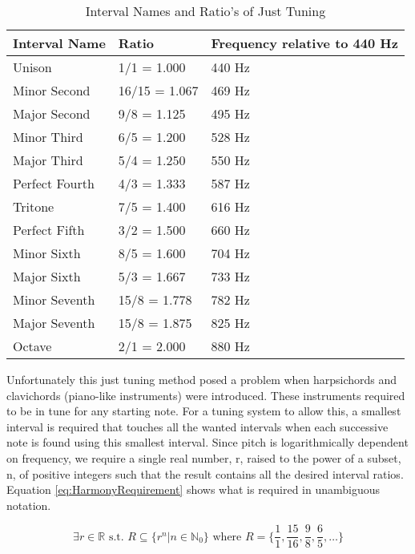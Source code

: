 \begin{table}[h]
\centering
\caption{Interval Names and Ratio's of Just Tuning}
\begin{tabu} to \textwidth { | X[l] | X[c] | X[r] | }
	\hline \bf Interval Name & \bf Ratio  & Frequency relative to 440 Hz \\
	\hline Unison & 1/1 = 1.000 & 440 Hz \\
	\hline Minor Second & 16/15 = 1.067 & 469 Hz \\
	\hline Major Second & 9/8 = 1.125 & 495 Hz \\
	\hline Minor Third & 6/5 = 1.200 & 528 Hz \\
	\hline Major Third & 5/4 = 1.250 & 550 Hz \\
	\hline Perfect Fourth & 4/3 = 1.333 & 587 Hz \\
	\hline Tritone & 7/5 = 1.400 & 616 Hz \\
	\hline Perfect Fifth & 3/2 = 1.500 & 660 Hz \\
	\hline Minor Sixth & 8/5 = 1.600 & 704 Hz \\
	\hline Major Sixth & 5/3 = 1.667 & 733 Hz \\
	\hline Minor Seventh & 15/8 = 1.778 & 782 Hz \\
	\hline Major Seventh & 15/8 = 1.875 & 825 Hz \\
	\hline Octave & 2/1 = 2.000 & 880 Hz \\
	\hline
\end{tabu}
\label{tab:JustTuning}
\end{table}

Unfortunately this just tuning method posed a problem when harpsichords and
clavichords (piano-like instruments) were introduced. These instruments required
to be in tune for any starting note. For a tuning system to allow this, a smallest
interval is required that touches all the wanted intervals when each successive
note is found using this smallest interval. Since pitch is logarithmically
dependent on frequency, we require a single real number, r, raised to the power of
a subset, n, of positive integers such that the result contains all the desired
interval ratios. Equation \ref{eq:HarmonyRequirement} shows what is required in
unambiguous notation.

\begin{equation}\label{eq:HarmonyRequirement}
	\exists r \in \mathbb{R} \text{ s.t. }
	R \subseteq \{ r^n | n \in \mathbb{N}_0 \}
	\text{ where } R = \{ \frac{1}{1}, \frac{15}{16}, \frac{9}{8}, \frac{6}{5}, \dots \}
\end{equation}

